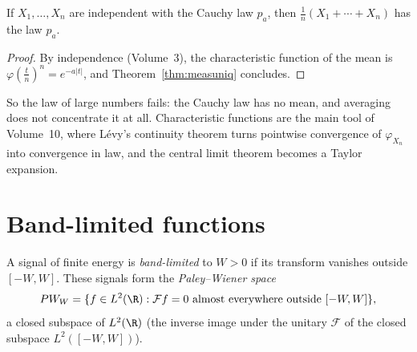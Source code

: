 \begin{corollary}\label{cor:cauchymean}
If $X_1,\dots,X_n$ are independent with the Cauchy law $p_a$, then $\frac1n(X_1+\cdots+X_n)$ has the law $p_a$.
\end{corollary}
\begin{proof}
By independence (Volume~3), the characteristic function of the mean is $\varphi(\frac tn)^n=e^{-a|t|}$, and Theorem~\ref{thm:measuniq} concludes.
\end{proof}

So the law of large numbers fails: the Cauchy law has no mean, and averaging does not concentrate it at all. Characteristic functions are the main tool of Volume~10, where L\'evy's continuity theorem turns
pointwise convergence of $\varphi_{X_n}$ into convergence in law, and the central limit theorem becomes a Taylor expansion.

\section{Band-limited functions}

A signal of finite energy is \emph{band-limited} to $W>0$ if its transform vanishes outside $[-W,W]$. These signals form the \emph{Paley--Wiener space}
\[PW_W=\{f\in L^2(\R):\mathcal Ff=0\text{ almost everywhere outside }[-W,W]\},\]
a closed subspace of $L^2(\R)$ (the inverse image under the unitary $\mathcal F$ of the closed subspace $L^2([-W,W])$).

